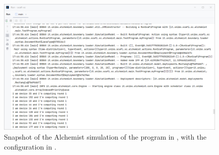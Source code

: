 \begin{figure}
    \centering
    \caption{Snapshot of the Alchemist simulation of the program in , with the configuration in .}
    \label{fig:alchemist-simulation}
    \bigskip
    \includegraphics[width=\linewidth]{figures/alchemist-demo.png}
\end{figure}

